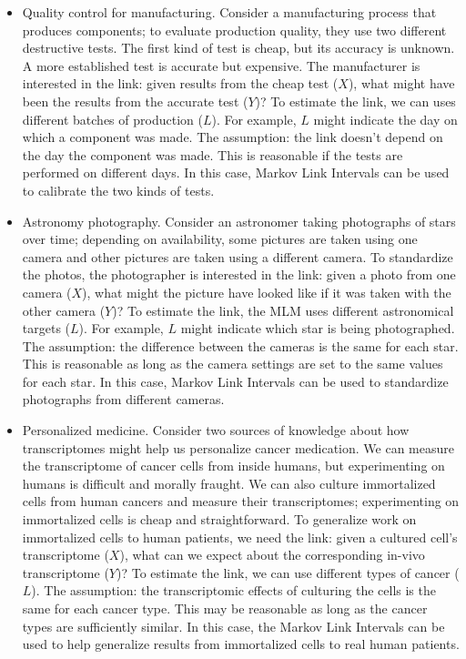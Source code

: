 \documentclass{article}
\theoremstyle{definition}
\begin{document}
\begin{itemize}
    \item Quality control for manufacturing.   Consider a manufacturing process that produces components; to evaluate production quality, they use two different destructive tests.   The first kind of test is cheap, but its accuracy is unknown.  A more established test is accurate but expensive.  The manufacturer is interested in the link: given results from the cheap test ($X$), what might have been the results from the accurate test ($Y$)?   To estimate the link, we can uses different batches of production ($L$).  For example, $L$ might indicate the day on which a component was made.  The assumption: the link doesn't depend on the day the component was made. This is reasonable if the tests are performed on different days.  In this case, Markov Link Intervals can be used to calibrate the two kinds of tests.    

    \item Astronomy photography.  Consider an astronomer taking photographs of stars over time; depending on availability, some pictures are taken using one camera and other pictures are taken using a different camera.  To standardize the photos, the photographer is interested in the link: given a photo from one camera ($X$), what might the picture have looked like if it was taken with the other camera ($Y$)?  To estimate the link, the MLM uses different astronomical targets ($L$).   For example, $L$ might indicate which star is being photographed.  The assumption: the difference between the cameras is the same for each star.  This is reasonable as long as the camera settings are set to the same values for each star.  In this case, Markov Link Intervals can be used to standardize photographs from different cameras.  
 
    \item Personalized medicine.   Consider two sources of knowledge about how transcriptomes might help us personalize cancer medication.  We can measure the transcriptome of cancer cells from inside humans, but experimenting on humans is difficult and morally fraught.  We can also culture immortalized cells from human cancers and measure their transcriptomes;  experimenting on immortalized cells is cheap and straightforward.  To generalize work on immortalized cells to human patients, we need the link: given a cultured cell's transcriptome ($X$), what can we expect about the corresponding in-vivo transcriptome ($Y$)?  To estimate the link, we can use different types of cancer ($L$).  The assumption: the transcriptomic effects of culturing the cells is the same for each cancer type.  This may be reasonable as long as the cancer types are sufficiently similar.  In this case, the Markov Link Intervals  can be used to help generalize results from immortalized cells to real human patients.


\end{itemize}
\end{document}

